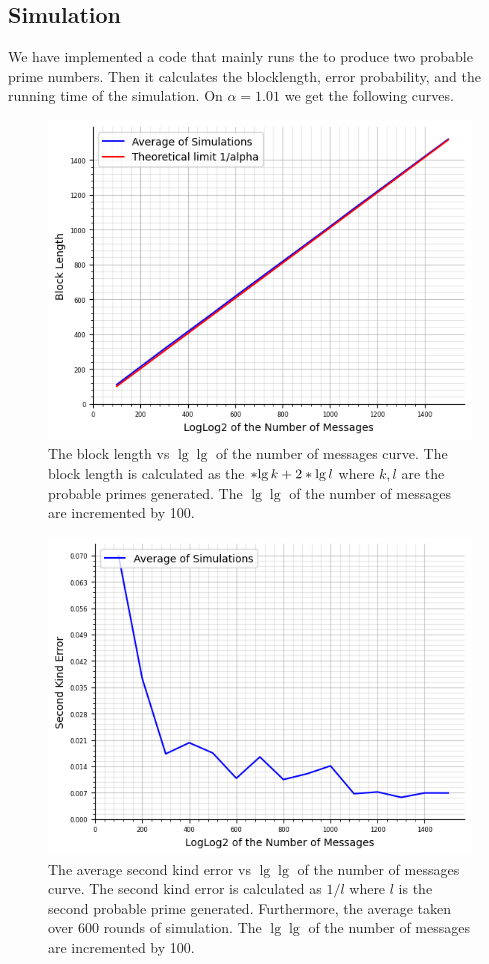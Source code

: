 \subsection{Simulation}
We have implemented a code that mainly runs the  to produce two probable prime numbers. Then it calculates the blocklength, error probability, and the running time of the simulation. On \(\alpha = 1.01\) we get the following curves.
\begin{figure}
	\includegraphics*[height = 0.4 \textheight]{graphic/msg26.png}
	\caption{The block length vs \(\lg \lg \) of the number of messages curve. The block length is calculated as the \(\ceil{\lg k} + 2 \ceil{\lg l}\) where \(k,l\) are the probable primes generated. The \(\lg \lg \) of the number of messages are incremented by 100.}
\end{figure}
\begin{figure}
	\includegraphics*[height = 0.4 \textheight]{graphic/errwo26.png}
	\caption{The average second kind error vs  \(\lg \lg \) of the number of messages curve. The second kind error is calculated as \(1/l\) where \(l\) is the second probable prime generated. Furthermore, the average taken over 600 rounds of simulation. The \(\lg \lg \) of the number of messages are incremented by 100.}
\end{figure}
